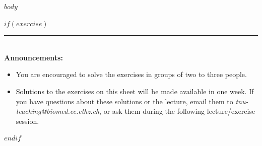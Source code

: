 \documentclass[a4paper,11pt]{article}
\begin{document}
$body$

$if(exercise)$
  \vspace{.5cm}
  \noindent
  \rule{\textwidth}{0.4pt}
  \vspace{.5cm}\\
  \textbf{Announcements:}
  \begin{itemize}
  \item You are encouraged to solve the exercises in groups of two to three people.
  \item Solutions to the exercises on this sheet will be made available in one week. If you have questions about these solutions or the lecture, email them to \emph{tnu-teaching@biomed.ee.ethz.ch}, or ask them during the following lecture/exercise session.
  \end{itemize}
$endif$
\end{document}
